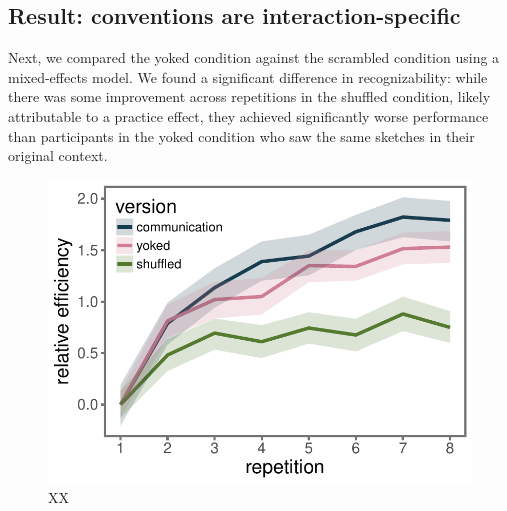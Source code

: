 \documentclass[10pt,letterpaper]{article}
\begin{document}
\subsection{Result: conventions are interaction-specific}




Next, we compared the yoked condition against the scrambled condition using a mixed-effects model.
We found a significant difference in recognizability: while there was some improvement across repetitions in the shuffled condition, likely attributable to a practice effect, they achieved significantly worse performance than participants in the yoked condition who saw the same sketches in their original context. 


\begin{figure}
\includegraphics[width=\linewidth]{figures/recog_BIS_timeseries.pdf}
\caption{XX} \label{recog_bis}
\end{figure}
\end{document}
